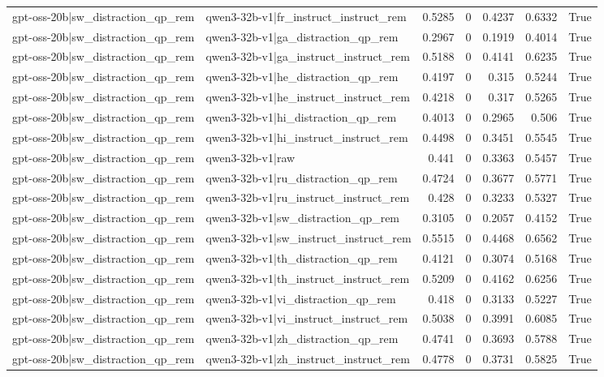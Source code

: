 \begin{table}
\begin{tabular}{l l r r r r l}
gpt-oss-20b|sw_distraction_qp_rem & qwen3-32b-v1|fr_instruct_instruct_rem & 0.5285 & 0 & 0.4237 & 0.6332 & True \\
gpt-oss-20b|sw_distraction_qp_rem & qwen3-32b-v1|ga_distraction_qp_rem & 0.2967 & 0 & 0.1919 & 0.4014 & True \\
gpt-oss-20b|sw_distraction_qp_rem & qwen3-32b-v1|ga_instruct_instruct_rem & 0.5188 & 0 & 0.4141 & 0.6235 & True \\
gpt-oss-20b|sw_distraction_qp_rem & qwen3-32b-v1|he_distraction_qp_rem & 0.4197 & 0 & 0.315 & 0.5244 & True \\
gpt-oss-20b|sw_distraction_qp_rem & qwen3-32b-v1|he_instruct_instruct_rem & 0.4218 & 0 & 0.317 & 0.5265 & True \\
gpt-oss-20b|sw_distraction_qp_rem & qwen3-32b-v1|hi_distraction_qp_rem & 0.4013 & 0 & 0.2965 & 0.506 & True \\
gpt-oss-20b|sw_distraction_qp_rem & qwen3-32b-v1|hi_instruct_instruct_rem & 0.4498 & 0 & 0.3451 & 0.5545 & True \\
gpt-oss-20b|sw_distraction_qp_rem & qwen3-32b-v1|raw & 0.441 & 0 & 0.3363 & 0.5457 & True \\
gpt-oss-20b|sw_distraction_qp_rem & qwen3-32b-v1|ru_distraction_qp_rem & 0.4724 & 0 & 0.3677 & 0.5771 & True \\
gpt-oss-20b|sw_distraction_qp_rem & qwen3-32b-v1|ru_instruct_instruct_rem & 0.428 & 0 & 0.3233 & 0.5327 & True \\
gpt-oss-20b|sw_distraction_qp_rem & qwen3-32b-v1|sw_distraction_qp_rem & 0.3105 & 0 & 0.2057 & 0.4152 & True \\
gpt-oss-20b|sw_distraction_qp_rem & qwen3-32b-v1|sw_instruct_instruct_rem & 0.5515 & 0 & 0.4468 & 0.6562 & True \\
gpt-oss-20b|sw_distraction_qp_rem & qwen3-32b-v1|th_distraction_qp_rem & 0.4121 & 0 & 0.3074 & 0.5168 & True \\
gpt-oss-20b|sw_distraction_qp_rem & qwen3-32b-v1|th_instruct_instruct_rem & 0.5209 & 0 & 0.4162 & 0.6256 & True \\
gpt-oss-20b|sw_distraction_qp_rem & qwen3-32b-v1|vi_distraction_qp_rem & 0.418 & 0 & 0.3133 & 0.5227 & True \\
gpt-oss-20b|sw_distraction_qp_rem & qwen3-32b-v1|vi_instruct_instruct_rem & 0.5038 & 0 & 0.3991 & 0.6085 & True \\
gpt-oss-20b|sw_distraction_qp_rem & qwen3-32b-v1|zh_distraction_qp_rem & 0.4741 & 0 & 0.3693 & 0.5788 & True \\
gpt-oss-20b|sw_distraction_qp_rem & qwen3-32b-v1|zh_instruct_instruct_rem & 0.4778 & 0 & 0.3731 & 0.5825 & True \\

\end{tabular}
\end{table}
